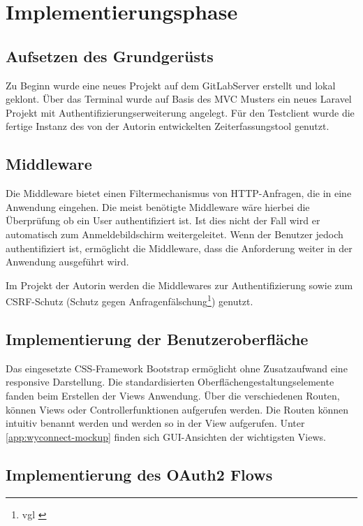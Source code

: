 \section{Implementierungsphase} 
\label{sec:Implementierungsphase}

\subsection{Aufsetzen des Grundgerüsts}
\label{sec:AufsetzenGrundgeruest}

Zu Beginn wurde eine neues Projekt auf dem GitLabServer erstellt und lokal geklont. Über das Terminal wurde auf Basis des MVC Musters ein neues Laravel Projekt mit Authentifizierungserweiterung angelegt. 
Für den Testclient wurde die fertige Instanz des von der Autorin entwickelten Zeiterfassungstool genutzt.

\subsection{Middleware}
\label{sec:Middleware}
Die Middleware bietet einen Filtermechanismus von HTTP-Anfragen, die in eine Anwendung eingehen. Die meist benötigte Middleware wäre hierbei die Überprüfung ob ein User authentifiziert ist. Ist dies nicht der Fall wird er automatisch zum Anmeldebildschirm weitergeleitet. Wenn der Benutzer jedoch authentifiziert ist, ermöglicht die Middleware, dass die Anforderung weiter in der Anwendung ausgeführt wird.

Im Projekt der Autorin werden die Middlewares zur Authentifizierung sowie zum \acs{CSRF}-Schutz (Schutz gegen Anfragenfälschung\footnote{vgl \cite{CSRF}}) genutzt.

\subsection{Implementierung der Benutzeroberfläche}
\label{sec:ImplBenutzeroberflaeche}

Das eingesetzte CSS-Framework Bootstrap ermöglicht ohne Zusatzaufwand eine responsive Darstellung. Die standardisierten Oberflächengestaltungselemente fanden beim Erstellen der Views Anwendung. 
Über die verschiedenen Routen, können Views oder Controllerfunktionen aufgerufen werden. Die Routen können intuitiv benannt werden und werden so in der View aufgerufen.
Unter \ref{app:wyconnect-mockup} finden sich GUI-Ansichten der wichtigsten Views.

\subsection{Implementierung des OAuth2 Flows}
\label{sec:ImplementierungOAuth2}

